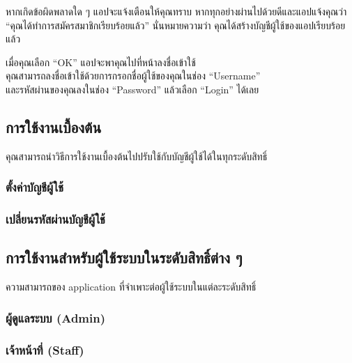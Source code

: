 หากเกิดข้อผิดพลาดใด ๆ แอปจะแจ้งเตือนให้คุณทราบ
หากทุกอย่างผ่านไปด้วยดีและแอปแจ้งคุณว่า ``คุณได้ทำการสมัครสมาชิกเรียบร้อยแล้ว'' นั่นหมายความว่า คุณได้สร้างบัญชีผู้ใช้ของแอปเรียบร้อยแล้ว

เมื่อคุณเลือก ``OK'' แอปจะพาคุณไปที่หน้าลงชื่อเข้าใช้\\
คุณสามารถลงชื่อเข้าใช้ด้วยการกรอกชื่อผู้ใช้ของคุณในช่อง ``Username''\\
และรหัสผ่านของคุณลงในช่อง ``Password'' แล้วเลือก ``Login'' ได้เลย

\pagebreak[4]

\subsection{การใช้งานเบื้องต้น}\label{subsec:basic-usage}

คุณสามารถนำวิธีการใช้งานเบื้องต้นไปปรับใช้กับบัญชีผู้ใช้ได้ในทุกระดับสิทธิ์

\subsubsection{ตั้งค่าบัญชีผู้ใช้}\label{subsec:acct-settings}

\blindtext[3]

\subsubsection{เปลี่ยนรหัสผ่านบัญชีผู้ใช้}\label{subsec:changing-password}

\blindtext[3]

\pagebreak[4]

\subsection{การใช้งานสำหรับผู้ใช้ระบบในระดับสิทธิ์ต่าง ๆ}\label{subsec:role-specific-usage}
ความสามารถของ application ที่จำเพาะต่อผู้ใช้ระบบในแต่ละระดับสิทธิ์

\subsubsection{ผู้ดูแลระบบ (Admin)}\label{subsubsec:role-usage-admin}

\blindtext[3]

\subsubsection{เจ้าหน้าที่ (Staff)}\label{subsubsec:role-usage-staff}

